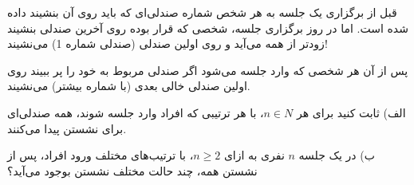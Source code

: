 \p
    قبل از برگزاری یک جلسه به هر شخص شماره صندلی‌ای که باید روی آن بنشیند داده شده است. اما در روز برگزاری جلسه، شخصی که قرار بوده روی آخرین صندلی بنشیند زودتر از همه می‌آید و روی اولین صندلی (صندلی شماره 1) می‌نشیند! 
    
    پس از آن هر شخصی که وارد جلسه می‌شود اگر صندلی مربوط به خود را پر ببیند روی اولین صندلی خالی بعدی (با شماره بیشتر) می‌نشیند. 
    
    الف) ثابت کنید برای هر $n \in N$، با هر ترتیبی که افراد وارد جلسه شوند، همه صندلی‌ای برای نشستن پیدا می‌کنند.
    
    ب) در یک جلسه $n$ نفری به ازای $n \geq 2$، با ترتیب‌های مختلف ورود افراد، پس از نشستن همه، چند حالت مختلف نشستن بوجود می‌آید؟

